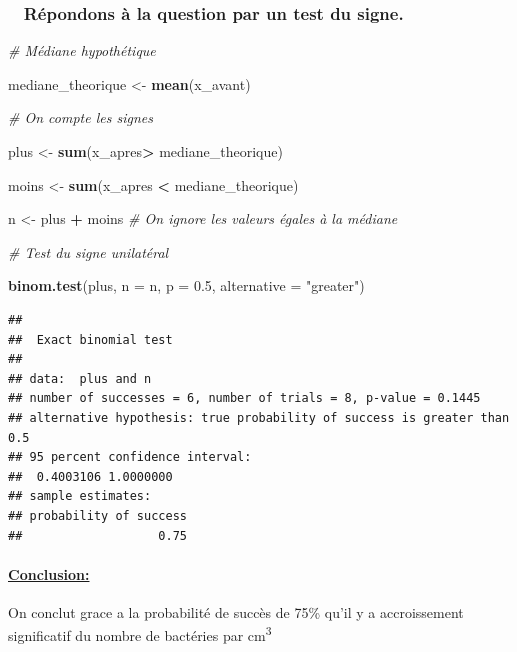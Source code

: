 \documentclass[
]{article}
\newenvironment{Shaded}{\begin{snugshade}}{\end{snugshade}}
\newcommand{\AttributeTok}[1]{\textcolor[rgb]{0.13,0.29,0.53}{#1}}
\newcommand{\CommentTok}[1]{\textcolor[rgb]{0.56,0.35,0.01}{\textit{#1}}}
\newcommand{\FloatTok}[1]{\textcolor[rgb]{0.00,0.00,0.81}{#1}}
\newcommand{\FunctionTok}[1]{\textcolor[rgb]{0.13,0.29,0.53}{\textbf{#1}}}
\newcommand{\NormalTok}[1]{#1}
\newcommand{\OtherTok}[1]{\textcolor[rgb]{0.56,0.35,0.01}{#1}}
\newcommand{\SpecialCharTok}[1]{\textcolor[rgb]{0.81,0.36,0.00}{\textbf{#1}}}
\newcommand{\StringTok}[1]{\textcolor[rgb]{0.31,0.60,0.02}{#1}}
\begin{document}
\subsubsection{\texorpdfstring{~ \textbf{Répondons à la question par un
test du
signe.}}{~ Répondons à la question par un test du signe.}}\label{ruxe9pondons-uxe0-la-question-par-un-test-du-signe.}

\begin{Shaded}
\begin{Highlighting}[]
\CommentTok{\# Médiane hypothétique }

\NormalTok{mediane\_theorique }\OtherTok{\textless{}{-}} \FunctionTok{mean}\NormalTok{(x\_avant)}

\CommentTok{\# On compte les signes }

\NormalTok{plus }\OtherTok{\textless{}{-}} \FunctionTok{sum}\NormalTok{(x\_apres}\SpecialCharTok{\textgreater{}}\NormalTok{ mediane\_theorique) }

\NormalTok{moins }\OtherTok{\textless{}{-}} \FunctionTok{sum}\NormalTok{(x\_apres }\SpecialCharTok{\textless{}}\NormalTok{ mediane\_theorique)  }

\NormalTok{n }\OtherTok{\textless{}{-}}\NormalTok{ plus }\SpecialCharTok{+}\NormalTok{ moins  }\CommentTok{\# On ignore les valeurs égales à la médiane }

\CommentTok{\# Test du signe unilatéral }

\FunctionTok{binom.test}\NormalTok{(plus, }\AttributeTok{n =}\NormalTok{ n, }\AttributeTok{p =} \FloatTok{0.5}\NormalTok{, }\AttributeTok{alternative =} \StringTok{"greater"}\NormalTok{)}
\end{Highlighting}
\end{Shaded}

\begin{verbatim}
## 
##  Exact binomial test
## 
## data:  plus and n
## number of successes = 6, number of trials = 8, p-value = 0.1445
## alternative hypothesis: true probability of success is greater than 0.5
## 95 percent confidence interval:
##  0.4003106 1.0000000
## sample estimates:
## probability of success 
##                   0.75
\end{verbatim}

\paragraph{\texorpdfstring{\ul{\textbf{Conclusion:}}}{Conclusion:}}\label{conclusion}

On conclut grace a la probabilité de succès de 75\% qu'il y a
accroissement significatif du nombre de bactéries par
cm\textsuperscript{3}
\end{document}
